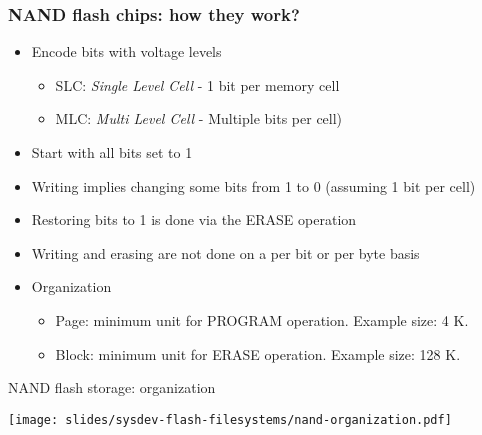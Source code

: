 \begin{frame}
  \frametitle{NAND flash chips: how they work?}
  \begin{itemize}
  \item Encode bits with voltage levels
    \begin{itemize}
      \item SLC: {\em Single Level Cell} - 1 bit per memory cell
      \item MLC: {\em Multi Level Cell} - Multiple bits per cell)
    \end{itemize}
  \item Start with all bits set to 1
  \item Writing implies changing some bits from 1 to 0
        (assuming 1 bit per cell)
  \item Restoring bits to 1 is done via the ERASE operation
  \item Writing and erasing are not done on a per bit or per byte
    basis
  \item Organization
    \begin{itemize}
    \item Page: minimum unit for PROGRAM operation. Example size: 4 K.
    \item Block: minimum unit for ERASE operation. Example size: 128 K.
    \end{itemize}
  \end{itemize}
\end{frame}

\begin{frame}{NAND flash storage: organization}
  \begin{center}
    \texttt{[image: slides/sysdev-flash-filesystems/nand-organization.pdf]}
  \end{center}
\end{frame}

